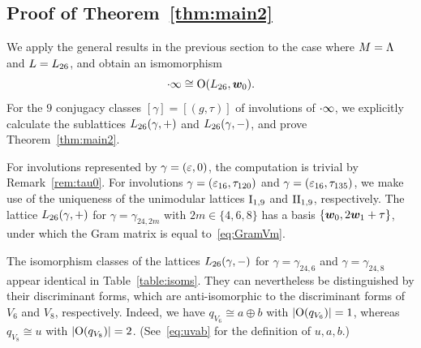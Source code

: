 \documentclass{amsart} %
\begin{document}
\subsection{Proof of  Theorem~\ref{thm:main2}}\label{subsec:proofmain2}
%
We apply the general results in the previous section to the case where $M=\Lambda$ and $L=L_{26}$,
and obtain an ismomorphism  
\[
\cdot \infty\cong \mathord{\mathrm{O}}(L_{26}, \boldsymbol{w}_0).
\]
%
For the $9$ conjugacy classes 
$[\gamma]=[(g, \tau)]$ of involutions of $\cdot \infty$,
we  explicitly calculate the sublattices $L_{26}(\gamma, +)$ and $L_{26}(\gamma, -)$, 
and prove  Theorem~\ref{thm:main2}.
%
\begin{remark}
For involutions represented by  $\gamma=(\varepsilon, 0)$,
the computation is trivial by Remark~\ref{rem:tau0}.
For involutions $\gamma=(\varepsilon_{16}, \tau_{120})$ and $\gamma=(\varepsilon_{16}, \tau_{135})$,
we make use of the uniqueness of the unimodular  lattices $\mathrm{I}_{1, 9}$ and $\mathrm{II}_{1, 9}$,
respectively.
The lattice $L_{26}(\gamma,+)$ for $\gamma=\gamma_{24,2m}$
with $2m \in \{4,6,8\}$ has a basis $\{\boldsymbol{w}_0, 2\boldsymbol{w}_1+\tau\}$, 
under which the Gram matrix is equal to~\eqref{eq:GramVm}.
\end{remark}
%
%
%
%
%
\begin{remark}
The isomorphism classes of the lattices $L_{26}(\gamma,-)$ for $\gamma=\gamma_{24,6}$ 
and $\gamma=\gamma_{24,8}$ 
appear identical in Table~\ref{table:isoms}. 
They can nevertheless be distinguished by their discriminant forms, 
which are anti-isomorphic to the discriminant forms of $V_6$ and $V_8$, respectively. 
Indeed, we have  $q_{V_6}\cong a\oplus b$ with $|\mathord{\mathrm{O}}(q_{V_6})|=1$, 
whereas $q_{V_8}\cong u$ with $|\mathord{\mathrm{O}}(q_{V_8})|=2$.
(See~\eqref{eq:uvab} for the definition of $u,  a, b$.)
 \end{remark}
%
%
%
\end{document}
